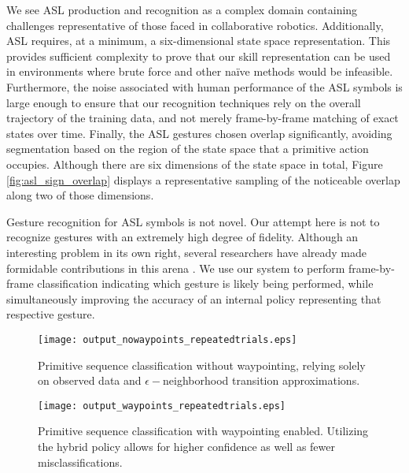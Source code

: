 \documentclass[letterpaper]{article}
\begin{document}
We see ASL production and recognition as a complex domain containing challenges representative of those faced in collaborative robotics. Additionally, ASL requires, at a minimum, a six-dimensional state space representation.  This provides sufficient complexity to prove that our skill representation can be used in environments where brute force and other na\"ive methods would be infeasible.  Furthermore, the noise associated with human performance of the ASL symbols is large enough to ensure that our recognition techniques rely on the overall trajectory of the training data, and not merely frame-by-frame matching of exact states over time.  Finally, the ASL gestures chosen overlap significantly, avoiding segmentation based on the region of the state space that a primitive action occupies. Although there are six dimensions of the state space in total, Figure \ref{fig:asl_sign_overlap} displays a representative sampling of the noticeable overlap along two of those dimensions.

Gesture recognition for ASL symbols is not novel.  Our attempt here is not to recognize gestures with an extremely high degree of fidelity.  Although an interesting problem in its own right, several researchers have already made formidable contributions in this arena \cite{HandGestures,HSMMRecognition,POMDPGesture,HoughASL,ASLRealTime,MotionASL}.  We use our system to perform frame-by-frame classification indicating which gesture is likely being performed, while simultaneously improving the accuracy of an internal policy representing that respective gesture.

\begin{figure}[t]
\begin{center}
\texttt{[image: output\_nowaypoints\_repeatedtrials.eps]}
\caption{Primitive sequence classification without waypointing, relying solely on observed data and $\epsilon-$neighborhood transition approximations.}
\label{fig:output_nowaypoints_repeatedtrials}
\end{center}
\end{figure}

\begin{figure}[t]
\begin{center}
\texttt{[image: output\_waypoints\_repeatedtrials.eps]}
\caption{Primitive sequence classification with waypointing enabled. Utilizing the hybrid policy allows for higher confidence as well as fewer misclassifications.}
\label{fig:output_waypoints_repeatedtrials}
\end{center}
\end{figure}
\end{document}

